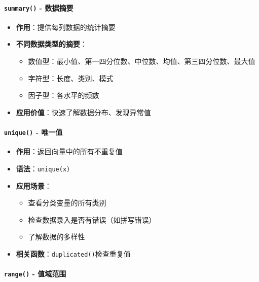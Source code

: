 \documentclass[
  twoside]{book}
\providecommand{\tightlist}{%
  \setlength{\itemsep}{0pt}\setlength{\parskip}{0pt}}
\begin{document}
\hypertarget{summary---ux6570ux636eux6458ux8981}{%
\paragraph{\texorpdfstring{\texttt{summary()} - 数据摘要}{summary() - 数据摘要}}\label{summary---ux6570ux636eux6458ux8981}}

\begin{itemize}
\tightlist
\item
  \textbf{作用}：提供每列数据的统计摘要
\item
  \textbf{不同数据类型的摘要}：

  \begin{itemize}
  \tightlist
  \item
    数值型：最小值、第一四分位数、中位数、均值、第三四分位数、最大值
  \item
    字符型：长度、类别、模式
  \item
    因子型：各水平的频数
  \end{itemize}
\item
  \textbf{应用价值}：快速了解数据分布、发现异常值
\end{itemize}

\hypertarget{unique---ux552fux4e00ux503c}{%
\paragraph{\texorpdfstring{\texttt{unique()} - 唯一值}{unique() - 唯一值}}\label{unique---ux552fux4e00ux503c}}

\begin{itemize}
\tightlist
\item
  \textbf{作用}：返回向量中的所有不重复值
\item
  \textbf{语法}：\texttt{unique(x)}
\item
  \textbf{应用场景}：

  \begin{itemize}
  \tightlist
  \item
    查看分类变量的所有类别
  \item
    检查数据录入是否有错误（如拼写错误）
  \item
    了解数据的多样性
  \end{itemize}
\item
  \textbf{相关函数}：\texttt{duplicated()}检查重复值
\end{itemize}

\hypertarget{range---ux503cux57dfux8303ux56f4}{%
\paragraph{\texorpdfstring{\texttt{range()} - 值域范围}{range() - 值域范围}}\label{range---ux503cux57dfux8303ux56f4}}
\end{document}
